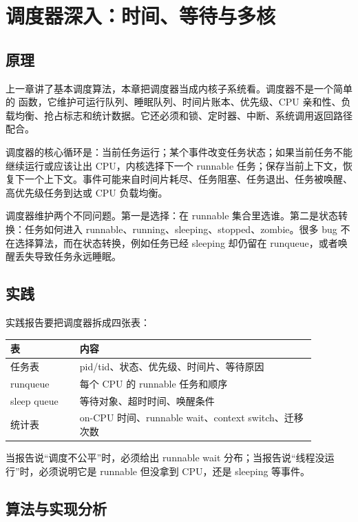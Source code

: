 \chapter{调度器深入：时间、等待与多核}

\section{原理}

上一章讲了基本调度算法，本章把调度器当成内核子系统看。调度器不是一个简单的  函数，它维护可运行队列、睡眠队列、时间片账本、优先级、CPU 亲和性、负载均衡、抢占标志和统计数据。它还必须和锁、定时器、中断、系统调用返回路径配合。

调度器的核心循环是：当前任务运行；某个事件改变任务状态；如果当前任务不能继续运行或应该让出 CPU，内核选择下一个 runnable 任务；保存当前上下文，恢复下一个上下文。事件可能来自时间片耗尽、任务阻塞、任务退出、任务被唤醒、高优先级任务到达或 CPU 负载均衡。

调度器维护两个不同问题。第一是选择：在 runnable 集合里选谁。第二是状态转换：任务如何进入 runnable、running、sleeping、stopped、zombie。很多 bug 不在选择算法，而在状态转换，例如任务已经 sleeping 却仍留在 runqueue，或者唤醒丢失导致任务永远睡眠。

\section{实践}

实践报告要把调度器拆成四张表：

\begin{longtable}{|p{0.2\linewidth}|p{0.68\linewidth}|}
\toprule
表 & 内容 \\
\midrule
任务表 & pid/tid、状态、优先级、时间片、等待原因 \\\tablerowrule
runqueue & 每个 CPU 的 runnable 任务和顺序 \\\tablerowrule
sleep queue & 等待对象、超时时间、唤醒条件 \\\tablerowrule
统计表 & on-CPU 时间、runnable wait、context switch、迁移次数 \\
\bottomrule
\end{longtable}

当报告说“调度不公平”时，必须给出 runnable wait 分布；当报告说“线程没运行”时，必须说明它是 runnable 但没拿到 CPU，还是 sleeping 等事件。

\section{算法与实现分析}


